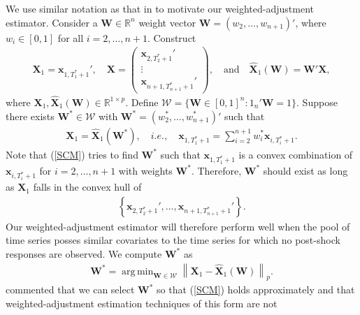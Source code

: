 \documentclass[11pt]{article}
\newcommand{\R}{\mathbb{R}}
\def\mbf#1{\mathbf{#1}} %
\def\mc#1{\mathcal{#1}} %
\DeclareMathOperator*{\argmin}{arg\,min} %
\newcommand{\norm}[1]{\left\lVert#1\right\rVert} %
\theoremstyle{definition}
\begin{document}
We use similar notation as that in \cite{abadie2010synthetic} to motivate our weighted-adjustment estimator. Consider a $\mbf{W} \in \R^n$ weight vector 
$\mbf{W}=(w_2, \ldots, w_{n+1})'$, where $w_i\in [0,1]$ for all 
$i = 2, \ldots, n+1$. Construct
\begin{align*}
 \mbf{X}_1 = \mbf{x}_{1, T_1^*+1}',
  \quad  
  \mbf{X} = \begin{pmatrix}
    \mbf{x}_{2, T_2^*+1}' \\
    \vdots \\
    \mbf{x}_{n+1, T_{n+1}^*+1}'
  \end{pmatrix},
  \quad \text{and} \quad 
  \hat{\mbf{X}}_1(\mbf{W}) 
    = \mbf{W}'\mbf{X},
\end{align*}
where $\mbf{X}_1,\hat{\mbf{X}}_1(\mbf{W}) \in \R^{1 \times p}$. Define $\mc{W}=\{\mbf{W}\in [0,1]^n \colon 1_n'\mbf{W} = 1 \}$. 
Suppose there exists $\mbf{W}^*\in \mc{W}$ with 
$\mbf{W}^*=(w_2^*, \ldots, w_{n+1}^*)'$ such that
\begin{align}
 \mbf{X}_1=\hat{\mbf{X}}_1(\mbf{W}^*),  \quad i.e., \quad \mbf{x}_{1, T_1^*+1} = \sum_{i=2}^{n+1} w_i^*\mbf{x}_{i, T_i^*+1}.\label{SCM}
\end{align}
Note that (\ref{SCM}) tries to find $\mbf{W}^*$ such that $\mbf{x}_{1, T_1^*+1}$ is a convex combination of $\mbf{x}_{i, T_i^*+1}$ for $i = 2, \ldots, n+1$ with weights $\mbf{W}^*$. Therefore, $\mbf{W}^*$ should exist as long as $\mbf{X}_1$ falls in the convex hull of 
 \begin{align*}
   \left\{ \mbf{x}_{2, T_2^*+1}', \ldots, \mbf{x}_{n+1, T_{n+1}^*+1}' \right\}.
 \end{align*}
Our weighted-adjustment estimator will therefore perform well when the pool of time series posses similar covariates to the time series for which no post-shock responses are observed. We compute $\mbf{W}^*$ as
\begin{align}
  \mbf{W}^* = \argmin_{\mbf{W}\in \mc{W}} \norm{\mbf{X}_1-\hat{\mbf{X}}_1(\mbf{W})}_{p}. 
  \label{W}
\end{align}
\cite{abadie2010synthetic} commented that we can select $\mbf{W}^*$ 
so that (\ref{SCM}) holds approximately %
and that weighted-adjustment estimation techniques of this form are not 
\end{document}
